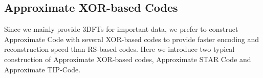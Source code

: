 \documentclass[sigconf]{acmart}
\begin{document}
\subsection{Approximate XOR-based Codes}\label{APPRXOR}
Since we mainly provide 3DFTs for important data, we prefer to construct Approximate Code with several XOR-based codes to provide faster encoding and reconstruction speed than RS-based codes. Here we introduce two typical construction of Approximate XOR-based codes, Approximate STAR Code and Approximate TIP-Code.

\begin{figure}[ht]
\centering
{}


\end{figure}
\end{document}
